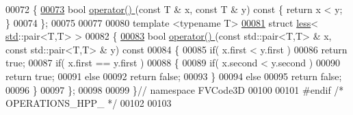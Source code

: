 \begin{DoxyCode}
00072 \{
\hypertarget{Operations_8hpp_source.tex_l00073}{}\hyperlink{structFVCode3D_1_1less_ab84f15efe248c8504788d3b627df7330}{00073}     \textcolor{keywordtype}{bool} \hyperlink{structFVCode3D_1_1less_ab84f15efe248c8504788d3b627df7330}{operator() }(\textcolor{keyword}{const} T & x, \textcolor{keyword}{const} T & y)\textcolor{keyword}{ const }\{ \textcolor{keywordflow}{return} x < y; \}
00074 \};
00075 
00077 
00080 \textcolor{keyword}{template} <\textcolor{keyword}{typename} T>
\hypertarget{Operations_8hpp_source.tex_l00081}{}\hyperlink{structFVCode3D_1_1less_3_01std_1_1pair_3_01T_00_01T_01_4_01_4}{00081} \textcolor{keyword}{struct }\hyperlink{structFVCode3D_1_1less}{less}< \hyperlink{namespacestd}{std}::pair<T,T> >
00082 \{
\hypertarget{Operations_8hpp_source.tex_l00083}{}\hyperlink{structFVCode3D_1_1less_3_01std_1_1pair_3_01T_00_01T_01_4_01_4_ad4272c44f7983a96b87dd01f12379dde}{00083}     \textcolor{keywordtype}{bool} \hyperlink{structFVCode3D_1_1less_ab84f15efe248c8504788d3b627df7330}{operator() }(\textcolor{keyword}{const} std::pair<T,T> & x, \textcolor{keyword}{const} std::pair<T,T> & y)\textcolor{keyword}{ const}
00084 \textcolor{keyword}{    }\{
00085         \textcolor{keywordflow}{if}( x.first < y.first )
00086             \textcolor{keywordflow}{return} \textcolor{keyword}{true};
00087         \textcolor{keywordflow}{if}( x.first == y.first )
00088         \{
00089             \textcolor{keywordflow}{if}( x.second < y.second )
00090                 \textcolor{keywordflow}{return} \textcolor{keyword}{true};
00091             \textcolor{keywordflow}{else}
00092                 \textcolor{keywordflow}{return} \textcolor{keyword}{false};
00093         \}
00094         \textcolor{keywordflow}{else}
00095             \textcolor{keywordflow}{return} \textcolor{keyword}{false};
00096     \}
00097 \};
00098 
00099 \}\textcolor{comment}{// namespace FVCode3D}
00100 
00101 \textcolor{preprocessor}{#endif }\textcolor{comment}{/* OPERATIONS\_HPP\_ */}\textcolor{preprocessor}{}
00102 
00103 
\end{DoxyCode}
